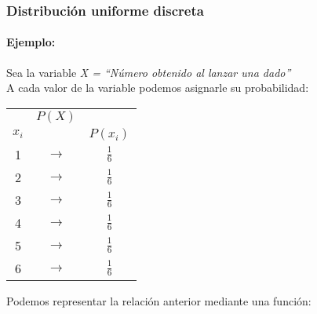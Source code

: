 \subsubsection{Distribución uniforme discreta}

\paragraph{Ejemplo: } Sea la variable \emph{X = “Número obtenido al lanzar una dado”}\\
A cada valor de la variable podemos asignarle su probabilidad:


\begin{center}
\begin{tabular}{ccc}
 & $P(X)$ &  \\
$x_i$ &  &  $P(x_i)$\\ \hline 
1 & $\rightarrow$ & $\tfrac{1}{6}$ \\ 
2 & $\rightarrow$ & $\tfrac{1}{6}$ \\ 
3 & $\rightarrow$ & $\tfrac{1}{6}$ \\ 
4 & $\rightarrow$ & $\tfrac{1}{6}$ \\ 
5 & $\rightarrow$ & $\tfrac{1}{6}$ \\ 
6 & $\rightarrow$ & $\tfrac{1}{6}$ \\ 
\end{tabular} 
\end{center}

Podemos representar la relación anterior mediante una función:

%
%

